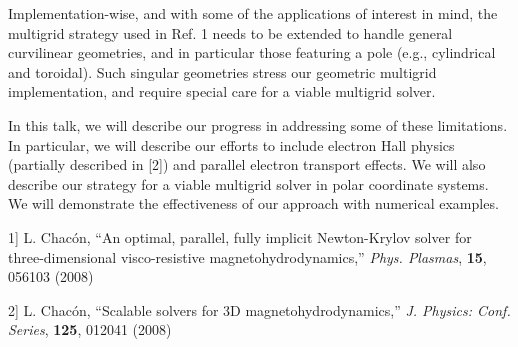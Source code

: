 \documentclass{report}
\begin{document}
Implementation-wise, and with some of the applications of interest
in mind, the multigrid strategy used in Ref. 1 needs to be extended
to handle general curvilinear geometries, and in particular those
featuring a pole (e.g., cylindrical and toroidal). Such singular geometries
stress our geometric multigrid implementation, and require special
care for a viable multigrid solver.

In this talk, we will describe our progress in addressing some of
these limitations. In particular, we will describe our efforts to
include electron Hall physics (partially described in {[}2{]}) and
parallel electron transport effects. We will also describe our strategy
for a viable multigrid solver in polar coordinate systems. We will
demonstrate the effectiveness of our approach with numerical examples.

\noindent {[}1{]} L. Chac\'on, ``An optimal, parallel, fully
implicit Newton-Krylov solver for three-dimensional visco-resistive
magnetohydrodynamics,'' \emph{Phys. Plasmas}, \textbf{15},
056103 (2008)

\noindent {[}2{]} L. Chac\'on, ``Scalable solvers for
3D magnetohydrodynamics,'' {\em J. Physics: Conf. Series},
{\bf 125}, 012041 (2008)
\end{document}
